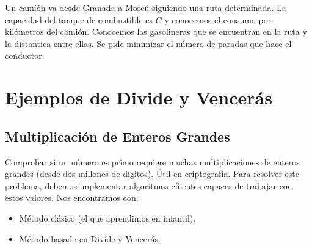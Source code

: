 \begin{ejercicio*}
    Un camión va desde Granada a Moscú siguiendo una ruta determinada. La capacidad del tanque de combustible es $C$ y conocemos el consumo por kilómetros del camión. Conocemos las gasolineras que se encuentran en la ruta y la distantica entre ellas. Se pide minimizar el número de paradas que hace el conductor.
\end{ejercicio*}

\section{Ejemplos de Divide y Vencerás}
\subsection{Multiplicación de Enteros Grandes}
Comprobar si un número es primo requiere muchas multiplicaciones de enteros grandes (desde dos millones de dígitos). Útil en criptografía. Para resolver este problema, debemos implementar algoritmos efiientes capaces de trabajar con estos valores. Nos encontramos con:
\begin{itemize}
    \item Método clásico (el que aprendimos en infantil).
    \item Método basado en Divide y Vencerás.
\end{itemize}

